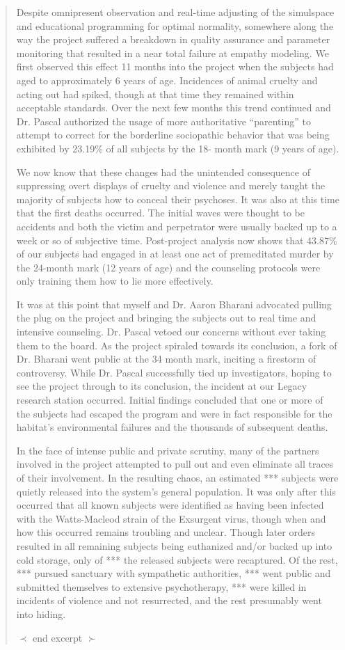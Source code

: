 \begin{quotation}
Despite omnipresent observation and
real-time adjusting of the simulspace and educational
programming for optimal normality,
somewhere along the way the project suffered
a breakdown in quality assurance and parameter
monitoring that resulted in a near total
failure at empathy modeling. We first observed
this effect 11 months into the project when the
subjects had aged to approximately 6 years of
age. Incidences of animal cruelty and acting
out had spiked, though at that time they remained
within acceptable standards. Over the
next few months this trend continued and Dr.
Pascal authorized the usage of more authoritative
“parenting” to attempt to correct for the
borderline sociopathic behavior that was being
exhibited by 23.19\% of all subjects by the 18-
month mark (9 years of age).

We now know that these changes had
the unintended consequence of suppressing
overt displays of cruelty and violence and
merely taught the majority of subjects how
to conceal their psychoses. It was also at this
time that the first deaths occurred. The initial
waves were thought to be accidents and
both the victim and perpetrator were usually
backed up to a week or so of subjective time.
Post-project analysis now shows that 43.87\%
of our subjects had engaged in at least one
act of premeditated murder by the 24-month
mark (12 years of age) and the counseling
protocols were only training them how to lie
more effectively.

It was at this point that myself and Dr.
Aaron Bharani advocated pulling the plug on
the project and bringing the subjects out to
real time and intensive counseling. Dr. Pascal
vetoed our concerns without ever taking them
to the board. As the project spiraled towards
its conclusion, a fork of Dr. Bharani went public
at the 34 month mark, inciting a firestorm of
controversy. While Dr. Pascal successfully tied
up investigators, hoping to see the project
through to its conclusion, the incident at our
Legacy research station occurred. Initial findings
concluded that one or more of the subjects
had escaped the program and were in fact
responsible for the habitat’s environmental failures
and the thousands of subsequent deaths.

In the face of intense public and private
scrutiny, many of the partners involved in
the project attempted to pull out and even
eliminate all traces of their involvement. In the
resulting chaos, an estimated *** subjects
were quietly released into the system’s general
population. It was only after this occurred that
all known subjects were identified as having
been infected with the Watts-Macleod strain
of the Exsurgent virus, though when and how
this occurred remains troubling and unclear.
Though later orders resulted in all remaining
subjects being euthanized and/or backed up
into cold storage, only of *** the released
subjects were recaptured. Of the rest, *** pursued
sanctuary with sympathetic authorities,
*** went public and submitted themselves
to extensive psychotherapy, *** were killed in
incidents of violence and not resurrected, and
the rest presumably went into hiding.

$\prec$ end excerpt $\succ$ 
\end{quotation}